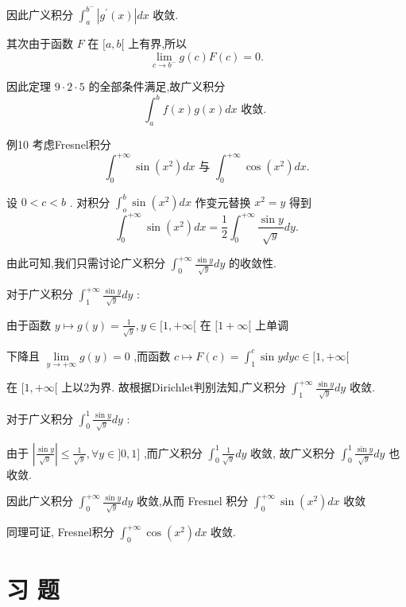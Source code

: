 因此广义积分 ${\int }_{a}^{{b}^{ - }}\left| {{g}^{\prime }\left( x\right) }\right| {dx}$ 收敛.

其次由于函数 $F$ 在 $\lbrack a,b\lbrack$ 上有界,所以
$$\mathop{\lim }\limits_{{c \rightarrow  {b}^{ - }}}g\left( c\right) F\left( c\right)  = 0.$$

因此定理 $9 \cdot  2 \cdot  5$ 的全部条件满足,故广义积分
$${\int }_{a}^{b}f\left( x\right) g\left( x\right) {dx}\text{ 收敛. }$$

例10 考虑Fresnel积分
$${\int }_{0}^{+\infty }\sin \left( {x}^{2}\right) {dx}\text{ 与 }{\int }_{0}^{+\infty }\cos \left( {x}^{2}\right) {dx}.$$

设 $0 < c < b$ . 对积分 ${\int }_{o}^{b}\sin \left( {x}^{2}\right) {dx}$ 作变元替换 ${x}^{2} = y$ 得到
$${\int }_{0}^{+\infty }\sin \left( {x}^{2}\right) {dx} = \frac{1}{2}{\int }_{0}^{+\infty }\frac{\sin y}{\sqrt{y}}{dy}.$$

由此可知,我们只需讨论广义积分 ${\int }_{0}^{+\infty }\frac{\sin y}{\sqrt{y}}{dy}$ 的收敛性.

对于广义积分 ${\int }_{1}^{+\infty }\frac{\sin y}{\sqrt{y}}{dy}$ :

由于函数 $y \mapsto  g\left( y\right)  = \frac{1}{\sqrt{y}},y \in  \lbrack 1, + \infty \lbrack$ 在 $\lbrack 1 + \infty \lbrack$ 上单调

下降且 $\mathop{\lim }\limits_{{y \rightarrow   + \infty }}g\left( y\right)  = 0$ ,而函数 $c \mapsto  F\left( c\right)  = {\int }_{1}^{c}\sin {ydyc} \in  \lbrack 1, + \infty \lbrack$

在 $\lbrack 1, + \infty \lbrack$ 上以2为界. 故根据Dirichlet判别法知,广义积分 ${\int }_{1}^{+\infty }\frac{\sin y}{\sqrt{y}}{dy}$ 收敛.

对于广义积分 ${\int }_{0}^{1}\frac{\sin y}{\sqrt{y}}{dy}$ :

由于 $\left| \frac{\sin y}{\sqrt{y}}\right|  \leq  \frac{1}{\sqrt{y}},\forall y \in  \rbrack 0,1\rbrack$ ,而广义积分 ${\int }_{0}^{1}\frac{1}{\sqrt{y}}{dy}$ 收敛, 故广义积分 ${\int }_{0}^{1}\frac{\sin y}{\sqrt{y}}{dy}$ 也收敛.

因此广义积分 ${\int }_{0}^{+\infty }\frac{\sin y}{\sqrt{y}}{dy}$ 收敛,从而 Fresnel 积分 ${\int }_{0}^{+\infty }\sin \left( {x}^{2}\right) {dx}$ 收敛

同理可证, Fresnel积分 ${\int }_{0}^{+\infty }\cos \left( {x}^{2}\right) {dx}$ 收敛.

\section*{习 题}

